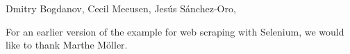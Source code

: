 Dmitry Bogdanov, Cecil Meeusen, Jesús Sánchez-Oro, 


For an earlier version of the example for web scraping with Selenium, we would like to thank Marthe Möller.
